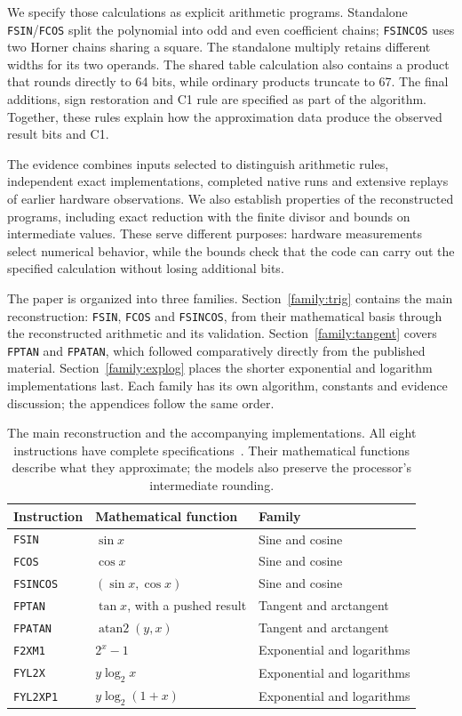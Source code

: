 \documentclass[11pt]{article}
\newcommand{\ins}[1]{\texttt{#1}}
\begin{document}
We specify those calculations as explicit arithmetic programs. Standalone
\ins{FSIN}/\ins{FCOS} split the polynomial into odd and even coefficient
chains; \ins{FSINCOS} uses two Horner chains sharing a square. The standalone
multiply retains different widths for its two operands. The shared table
calculation also contains a product that rounds directly to 64 bits, while
ordinary products truncate to 67. The final additions, sign restoration and
C1 rule are specified as part of the algorithm. Together, these rules explain how the approximation data produce the
observed result bits and C1.

The evidence combines inputs selected to distinguish arithmetic rules,
independent exact implementations, completed native runs and extensive replays
of earlier hardware observations. We also establish properties of the
reconstructed programs, including exact reduction with the finite divisor and
bounds on intermediate values. These serve different purposes: hardware
measurements select numerical behavior, while the bounds check that the code
can carry out the specified calculation without losing additional bits.

The paper is organized into three families. Section~\ref{family:trig}
contains the main reconstruction: \ins{FSIN}, \ins{FCOS} and \ins{FSINCOS},
from their mathematical basis through the reconstructed arithmetic and its
validation. Section~\ref{family:tangent} covers \ins{FPTAN} and \ins{FPATAN},
which followed comparatively directly from the published material.
Section~\ref{family:explog} places the shorter exponential and logarithm
implementations last. Each family has its own algorithm, constants and
evidence discussion; the appendices follow the same order.

\begin{table}[ht]
\centering\small
\begin{tabular}{@{}lll@{}}
\toprule
Instruction & Mathematical function & Family\\
\midrule
\ins{FSIN} & $\sin x$ & Sine and cosine\\
\ins{FCOS} & $\cos x$ & Sine and cosine\\
\ins{FSINCOS} & $(\sin x,\cos x)$ & Sine and cosine\\
\midrule
\ins{FPTAN} & $\tan x$, with a pushed result & Tangent and arctangent\\
\ins{FPATAN} & $\operatorname{atan2}(y,x)$ & Tangent and arctangent\\
\midrule
\ins{F2XM1} & $2^x-1$ & Exponential and logarithms\\
\ins{FYL2X} & $y\log_2x$ & Exponential and logarithms\\
\ins{FYL2XP1} & $y\log_2(1+x)$ & Exponential and logarithms\\
\bottomrule
\end{tabular}
\caption{The main reconstruction and the accompanying implementations.
All eight instructions have complete specifications~\cite{intelSdm}.
Their mathematical functions describe what they approximate; the models
also preserve the processor's intermediate rounding.}
\label{tab:scope}
\end{table}
\end{document}
